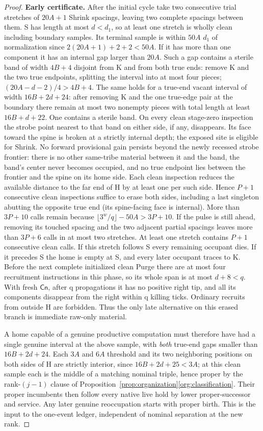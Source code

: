 \begin{proof}
\textbf{Early certificate.} After the initial cycle take two consecutive trial stretches of \(20A+1\) Shrink spacings, leaving two complete spacings between them. S has length at most \(d<d_1\), so at least one stretch is wholly clean including boundary samples. Its terminal sample is within \(50A\) \(d_1\) of normalization since \(2(20A+1)+2+2<50A\). If it has more than one component it has an internal gap larger than \(20A\). Such a gap contains a sterile band of width \(4B+4\) disjoint from K and from both true ends: remove K and the two true endpoints, splitting the interval into at most four pieces; \((20A- d- 2)/4>4B+4\). The same holds for a true-end vacant interval of width \(16B+2d+24\): after removing K and the one true-edge pair at the boundary there remain at most two nonempty pieces with total length at least \(16B+d+22\). One contains a sterile band. On every clean stage-zero inspection the strobe point nearest to that band on either side, if any, disappears. Its face toward the spine is broken at a strictly internal depth; the exposed site is eligible for Shrink. No forward provisional gain persists beyond the newly recessed strobe frontier: there is no other same-tribe material between it and the band, the band's center never becomes occupied, and no true endpoint lies between the frontier and the spine on its home side. Each clean inspection reduces the available distance to the far end of H by at least one per such side. Hence \(P+1\) consecutive clean inspections suffice to erase both sides, including a last singleton abutting the opposite true end (its spine-facing face is internal). More than \(3P+10\) calls remain because \(\lfloor 3^w/q \rfloor - 50A>3P+10\). If the pulse is still ahead, removing its touched spacing and the two adjacent partial spacings leaves more than \(3P+6\) calls in at most two stretches. At least one stretch contains \(P+1\) consecutive clean calls. If this stretch follows S every remaining occupant dies. If it precedes S the home is empty at S, and every later occupant traces to K. Before the next complete initialized clean Purge there are at most four recruitment instructions in this phase, so its whole span is at most \(d+8<q\). With fresh \(\mathsf{Cn}\), after q propagations it has no positive right tip, and all its components disappear from the right within q killing ticks. Ordinary recruits from outside H are forbidden. Thus the only late alternative on this erased branch is immediate raw-only material.

A home capable of a genuine productive computation must therefore have had a single genuine interval at the above sample, with \emph{both} true-end gaps smaller than \(16B+2d+24\). Each \(3A\) and \(6A\) threshold and its two neighboring positions on both sides of H are strictly interior, since \(16B+2d+25<3A\); at this clean sample each is the middle of a matching nominal triple, hence proper by the rank-\((j-1)\) clause of Proposition~\ref{prop:organization}\ref{org:classification}. Their proper incumbents then follow every native live hold by lower proper-successor and service. Any later genuine reoccupation starts with proper birth. This is the input to the one-event ledger, independent of nominal separation at the new rank.
\end{proof}

